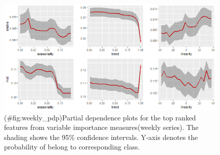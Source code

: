 \documentclass[11pt,a4paper,]{article}
\theoremstyle{definition}
\theoremstyle{definition}
\theoremstyle{definition}
\theoremstyle{remark}
\begin{document}
\newpage

\newpage

\begin{figure}
\centering
\includegraphics{figures/weekly_pdp-1.png}
\caption{(\#fig:weekly\_pdp)Partial dependence plots for the top ranked
features from variable importance measures(weekly series). The shading
shows the 95\% confidence intervals. Y-axis denotes the probability of
belong to corresponding class.}
\end{figure}

\newpage
\end{document}

